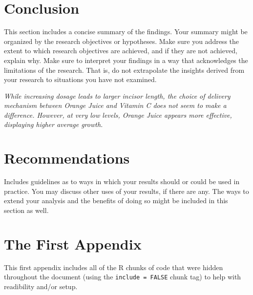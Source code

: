 \documentclass[12pt,oneside]{chicagocapstone}
\begin{document}
\hypertarget{conclusion}{%
\chapter*{Conclusion}\label{conclusion}}

This section includes a concise summary of the findings. Your summary might be organized by the research objectives or hypotheses. Make sure you address the extent to which research objectives are achieved, and if they are not achieved, explain why. Make sure to interpret your findings in a way that acknowledges the limitations of the research. That is, do not extrapolate the insights derived from your research to situations you have not examined.

\emph{While increasing dosage leads to larger incisor length, the choice of delivery mechanism between Orange Juice and Vitamin C does not seem to make a difference. However, at very low levels, Orange Juice appears more effective, displaying higher average growth.}

\hypertarget{recommendations}{%
\chapter*{Recommendations}\label{recommendations}}

Includes guidelines as to ways in which your results should or could be used in practice. You may discuss other uses of your results, if there are any. The ways to extend your analysis and the benefits of doing so might be included in this section as well.

\appendix

\hypertarget{the-first-appendix}{%
\chapter{The First Appendix}\label{the-first-appendix}}

This first appendix includes all of the R chunks of code that were hidden throughout the document (using the \texttt{include\ =\ FALSE} chunk tag) to help with readibility and/or setup.
\end{document}
